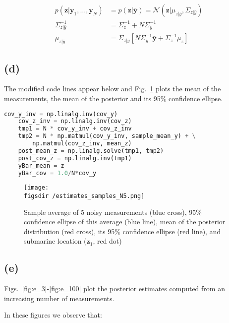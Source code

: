 \documentclass[12pt]{article}
\def\figsdir{../../../../../../code/scripts/probability/multivariateGaussians/inferenceInTheLinearGaussianModel/figures/}
\begin{document}
\begin{align}
    p(\mathbf{z}|\mathbf{y}_1,\ldots,\mathbf{y}_N)&=p(\mathbf{z}|\bar{\mathbf{y}})=\mathcal{N}(\mathbf{z}|\mu_{z|\bar{y}},\Sigma_{z|\bar{y}})\nonumber\\
    \Sigma^{-1}_{z|\bar{y}}&=\Sigma_z^{-1}+N\Sigma_y^{-1}\label{eq:postCov}\\
    \mu_{z|\bar{y}}&=\Sigma_{z|\bar{y}}\left[N\Sigma_y^{-1}\bar{\mathbf{y}}+\Sigma_z^{-1}\mu_z\right]\label{eq:postMean}
\end{align}

\subsection*{(d)} The modified code lines appear below and Fig.~\ref{fig:d}
plots the mean of the measurements, the mean of the posterior and its 95\%
confidence ellipse.

\begin{lstlisting}[language=Python]
    cov_y_inv = np.linalg.inv(cov_y)
    cov_z_inv = np.linalg.inv(cov_z)
    tmp1 = N * cov_y_inv + cov_z_inv
    tmp2 = N * np.matmul(cov_y_inv, sample_mean_y) + \
        np.matmul(cov_z_inv, mean_z)
    post_mean_z = np.linalg.solve(tmp1, tmp2)
    post_cov_z = np.linalg.inv(tmp1)
    yBar_mean = z
    yBar_cov = 1.0/N*cov_y
\end{lstlisting}

\begin{center}
    \begin{figure}[H]
        \texttt{[image: \\figsdir /estimates\_samples\_N5.png]}
        \caption{Sample average of 5 noisy measurements (blue cross), 95\%
        confidence ellipse of this average (blue line), mean of the posterior
        distribution (red cross), its 95\% confidence ellipse (red line), and
        submarine location ($\mathbf{z}_1$, red dot)}
        \label{fig:d}
    \end{figure}
\end{center}

\subsection*{(e)} Figs.~\ref{fig:e_3}-\ref{fig:e_100} plot the posterior
estimates computed from an increasing number of measurements.

In these figures we observe that:
\end{document}
